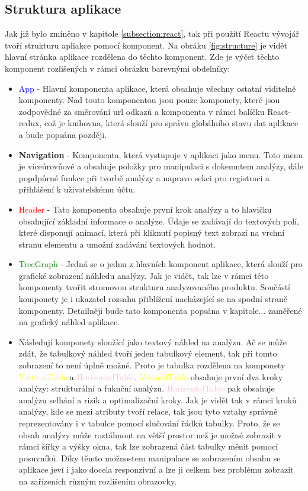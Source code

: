 \subsection{Struktura aplikace}
Jak již bylo zmíněno v kapitole \ref{subsection:react}, tak při použití Reactu vývojář tvoří strukturu apliakce pomocí komponent. Na obráku \ref{fig:structure} je vidět hlavní stránka aplikace rozdělena do těchto komponent. Zde je výčet těchto komponent rozlišených v rámci obrázku barevnými obdelníky: 

\begin{itemize}
    \item \textcolor{blue}{App} - Hlavní komponenta aplikace, která obsahuje všechny ostatní viditelné komponenty. Nad touto komponentou jsou pouze komponety, které jsou zodpovědné za směrování url odkazů a komponenta v rámci balíčku React-redux\cite{redux}, což je knihovna, která slouží pro správu globálního stavu dat aplikace a bude popsána později.  
    \item \textbf{Navigation} - Komponenta, která vystupuje v aplikaci jako menu. Toto menu je víceúrovňové a obsahuje položky pro manipulaci s dokemntem analýzy, dále popdpůrné funkce při tvorbě analýzy a napravo sekci pro registraci a přihlášení k uživatelskému účtu. 
    \item \textcolor{red}{Header} - Tato komponenta obsahuje první krok analýzy a to hlavičku obsahující základní informace o analýze. Údaje se zadávají do textových polí, které disponují animací, která při kliknutí popisný text zobrazí na vrchní stranu elementu a umožní zadávání textových hodnot.    
    \item \textcolor{green}{TreeGraph} - Jedná se o jednu z hlavních komponent aplikace, která slouží pro grafické zobrazení náhledu analýzy. Jak je vidět, tak lze v rámci této komponenty tvořit stromovou strukturu analyzovaného produktu. Součástí komponety je i ukazatel rozsahu přiblížení nacházející se na spodní straně komponenty. Detailněji bude tato komponenta popsána v kapitole... zaměřené na grafický náhled aplikace. 
    \item Následují komponety sloužící jako textový náhled na analýzu. Ač se může zdát, že tabulkový náhled tvoří jeden tabulkový element, tak při tomto zobrazení to není úplně možné. Proto je tabulka rozdělena na komponety \textcolor{yellow}{VerticalTable} a \textcolor{pink}{HorizontalTable}. \textcolor{yellow}{VerticalTable} obsahuje první dva kroky analýzy: strukturální a fuknční analýzu. \textcolor{pink}{HorizontalTable} pak obsahuje analýzu selhání a rizik a optimalizační kroky. Jak je vidět tak v rámci kroků analýzy, kde se mezi atributy tvoří relace, tak jsou tyto vztahy správně reprezentovány i v tabulce pomocí slučování řádků tabulky. Proto, že se obsah analýzy může roztáhnout na větší prostor než je možné zobrazit v rámci šířky a výšky okna, tak lze zobrazená část tabulky měnit pomocí posuvníků. Díky těmto možnostem manipulace se zobrazením obsahu se aplikace jeví i jako docela responzivní a lze ji celkem bez problému zobrazit na zařízeních různým rozlišením obrazovky. 

\end{itemize}


